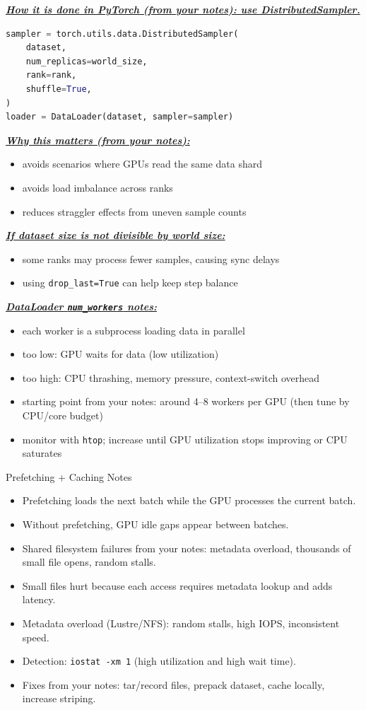 \documentclass[12pt]{article}
\newcommand{\keysent}[1]{\textbf{\textit{\uline{#1}}}}
\let\origtextbf\textbf
\renewcommand{\textbf}[1]{\origtextbf{\textit{#1}}}
\begin{document}
\keysent{How it is done in PyTorch (from your notes): use DistributedSampler.}

\begin{lstlisting}[language=Python, caption={DistributedSampler sketch from notes}]
sampler = torch.utils.data.DistributedSampler(
    dataset,
    num_replicas=world_size,
    rank=rank,
    shuffle=True,
)
loader = DataLoader(dataset, sampler=sampler)
\end{lstlisting}

\keysent{Why this matters (from your notes):}
\begin{itemize}
\item avoids scenarios where GPUs read the same data shard
\item avoids load imbalance across ranks
\item reduces straggler effects from uneven sample counts
\end{itemize}

\keysent{If dataset size is not divisible by world size:}
\begin{itemize}
\item some ranks may process fewer samples, causing sync delays
\item using \texttt{drop\_last=True} can help keep step balance
\end{itemize}

\keysent{DataLoader \texttt{num\_workers} notes:}
\begin{itemize}
\item each worker is a subprocess loading data in parallel
\item too low: GPU waits for data (low utilization)
\item too high: CPU thrashing, memory pressure, context-switch overhead
\item starting point from your notes: around 4--8 workers per GPU (then tune by CPU/core budget)
\item monitor with \texttt{htop}; increase until GPU utilization stops improving or CPU saturates
\end{itemize}

\begin{bluebox}{Prefetching + Caching Notes}
\begin{itemize}
\item Prefetching loads the next batch while the GPU processes the current batch.
\item Without prefetching, GPU idle gaps appear between batches.
\item Shared filesystem failures from your notes: metadata overload, thousands of small file opens, random stalls.
\item Small files hurt because each access requires metadata lookup and adds latency.
\item Metadata overload (Lustre/NFS): random stalls, high IOPS, inconsistent speed.
\item Detection: \texttt{iostat -xm 1} (high utilization and high wait time).
\item Fixes from your notes: tar/record files, prepack dataset, cache locally, increase striping.
\end{itemize}
\end{bluebox}
\end{document}
